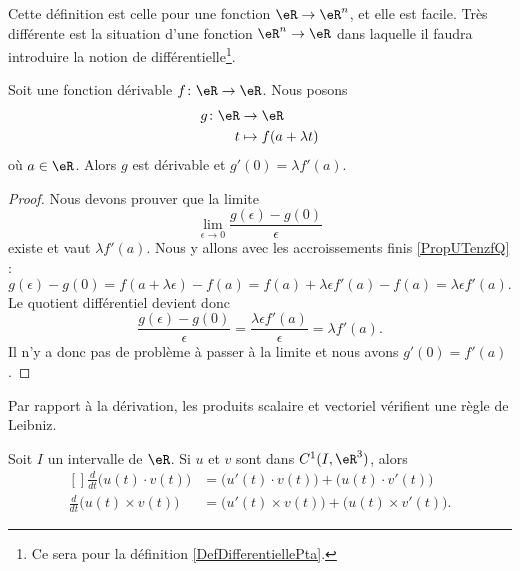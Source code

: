 Cette définition est celle pour une fonction \( \eR\to \eR^n\), et elle est facile. Très différente est la situation d'une fonction \( \eR^n\to \eR\) dans laquelle il faudra introduire la notion de différentielle\footnote{Ce sera pour la définition \ref{DefDifferentiellePta}.}.

\begin{lemma}       \label{LEMooXHVBooHYjXdq}
	Soit une fonction dérivable \( f\colon \eR\to \eR\). Nous posons
	\begin{equation}
		\begin{aligned}
			g\colon \eR & \to \eR                \\
			t           & \mapsto f(a+\lambda t)
		\end{aligned}
	\end{equation}
	où \( a\in \eR\). Alors \( g\) est dérivable et \( g'(0)=\lambda  f'(a)\).
\end{lemma}

\begin{proof}
	Nous devons prouver que la limite
	\begin{equation}
		\lim_{\epsilon\to 0}\frac{ g(\epsilon)-g(0) }{ \epsilon }
	\end{equation}
	existe et vaut \( \lambda f'(a)\). Nous y allons avec les accroissements finis \ref{PropUTenzfQ} :
	\begin{equation}
		g(\epsilon)-g(0)=f(a+\lambda \epsilon)-f(a)=f(a)+\lambda \epsilon f'(a)-f(a)=\lambda\epsilon f'(a).
	\end{equation}
	Le quotient différentiel devient donc
	\begin{equation}
		\frac{ g(\epsilon)-g(0) }{ \epsilon }=\frac{ \lambda \epsilon f'(a) }{ \epsilon }=\lambda f'(a).
	\end{equation}
	Il n'y a donc pas de problème à passer à la limite et nous avons \( g'(0)=f'(a)\).
\end{proof}
Par rapport à la dérivation, les produits scalaire et vectoriel vérifient une règle de Leibniz.

\begin{proposition}     \label{PROPooFKKHooQZGXhE}
	Soit \( I\) un intervalle de \( \eR\). Si \( u\) et \( v\) sont dans \( C^1(I,\eR^3)\), alors
	\begin{equation}	\label{EqFormLeibProdscalVect}
		\begin{aligned}[]
			\frac{ d }{ dt }\big( u(t)\cdot v(t) \big)  & =\big( u'(t)\cdot v(t) \big)+\big( u(t)\cdot v'(t) \big)    \\
			\frac{ d }{ dt }\big( u(t)\times v(t) \big) & =\big( u'(t)\times v(t) \big)+\big( u(t)\times v'(t) \big).
		\end{aligned}
	\end{equation}
\end{proposition}

